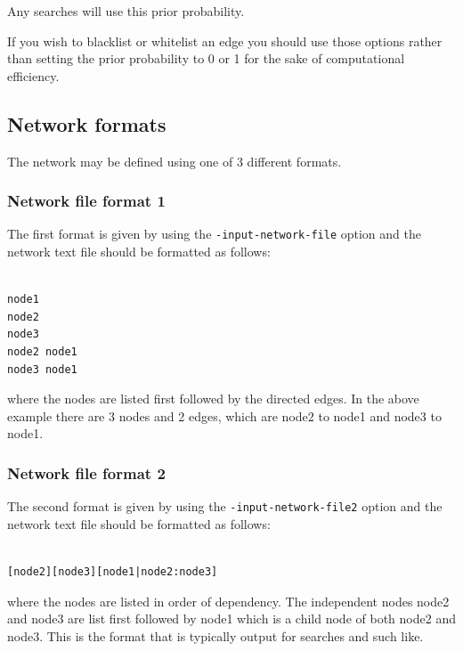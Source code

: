 \documentclass[a4paper,12pt]{article}
\newcommand{\code}[1]{{\footnotesize{{\tt #1}}}}
\begin{document}
Any searches will use this prior probability. 

If you wish to blacklist or whitelist an edge you should use those options rather than setting the prior probability to 0 or 1 for the sake of computational efficiency. 


\subsection{Network formats}
\label{input-network-formats}

The network may be defined using one of 3 different formats. 
\subsubsection{Network file format 1}
\label{input-network-formats-format1}

The first format is given by using the \code{-input-network-file} option and the network text file should be formatted as follows: 
\vspace{0.35cm} \begin{lstlisting}

node1
node2
node3
node2 node1
node3 node1

\end{lstlisting} \vspace{0.35cm}
where the nodes are listed first followed by the directed edges. In the above example there are 3 nodes and 2 edges, which are node2 to node1 and node3 to node1. 


\subsubsection{Network file format 2}
\label{input-network-formats-format2}

The second format is given by using the \code{-input-network-file2} option and the network text file should be formatted as follows: 
\vspace{0.35cm} \begin{lstlisting}

[node2][node3][node1|node2:node3]

\end{lstlisting} \vspace{0.35cm}
where the nodes are listed in order of dependency. The independent nodes node2 and node3 are list first followed by node1 which is a child node of both node2 and node3. This is the format that is typically output for searches and such like. 
\end{document}
